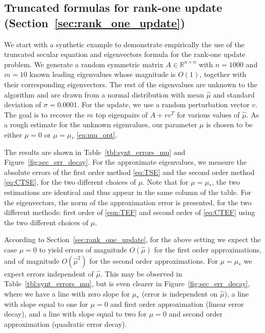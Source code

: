 \documentclass[11pt]{article}
\begin{document}
\subsection{Truncated formulas for rank-one update (Section~\ref{sec:rank_one_update})}

We start with a synthetic example to demonstrate empirically the use of the truncated secular equation and eigenvectors formula for the rank-one update problem. We generate a random symmetric matrix $A \in \mathbb{R}^{n \times n}$ with $n = 1000$ and $m = 10$ known leading eigenvalues whose magnitude is $O(1)$, together with their corresponding eigenvectors. The rest of the eigenvalues are unknown to the algorithm and are drawn from a normal distribution with mean $\hat{\mu}$ and standard deviation of $\sigma = 0.0001$. For the update, we use a random perturbation vector $v$. The goal is to recover the $m$ top eigenpairs of $A + vv^T$ for various values of $\hat{\mu}$. As a rough estimate for the unknown eigenvalues, our parameter $\mu$ is chosen to be either $\mu = 0$ or $\mu = \mu_\ast$ \eqref{eq:mu_opt}. 

The results are shown in Table~\ref{tbl:synt_errors_mu} and Figure~\ref{fig:sec_err_decay}. For the approximate eigenvalues, we measure the absolute errors of the first order method \eqref{eq:TSE} and the second order method \eqref{eq:CTSE}, for the two different choices of $\mu$. Note that for $\mu = \mu_\ast$, the two estimations are identical and thus appear in the same column of the table. For the eigenvectors, the norm of the approximation error is presented, for the two different methods: first order of \eqref{eqn:TEF} and second order of \eqref{eq:CTEF} using the two different choices of $\mu$.

According to Section~\ref{sec:rank_one_update}, for the above setting we expect the case $\mu = 0$ to yield errors of magnitude $O(\hat{\mu})$ for the first order approximations, and of magnitude $O(\hat{\mu}^2)$ for the second order approximations. For $\mu = \mu_\ast$ we expect errors independent of $\hat{\mu}$. This may be observed in Table~\ref{tbl:synt_errors_mu}, but is even clearer in Figure~\ref{fig:sec_err_decay}, where we have a  line with zero slope for $\mu_\ast$ (error is independent on $\hat{\mu}$), a line with slope equal to one for $\mu = 0$ and first order approximation (linear error decay), and a line with slope equal to two for $\mu = 0$ and second order approximation (quadratic error decay).
\end{document}

